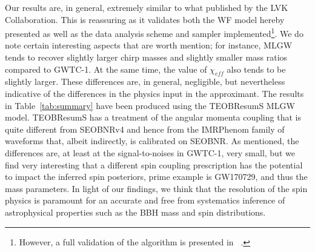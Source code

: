 Our results are, in general, extremely similar to what published by the LVK Collaboration. This is reassuring as it validates both the WF model hereby presented as well as the data analysis scheme and sampler implemented\footnote{However, a full validation of the algorithm is presented in ~\cite{}.}.
We do note certain interesting aspects that are worth mention; for instance, MLGW tends to recover slightly larger chirp masses and slightly 
smaller mass ratios compared to GWTC-1. At the same  time, the value of $\chi_{eff}$ also tends to be slightly larger. These differences are, in general, negligible, but nevertheless indicative of the differences in the physics input in the approximant. The results in Table~\ref{tab:summary} have been produced using the TEOBResumS MLGW model. TEOBResumS has a treatment of the angular momenta coupling that is quite different from SEOBNRv4 and hence from the IMRPhenom family of waveforms that, albeit indirectly, is calibrated on SEOBNR. As mentioned, the differences are, at least at the signal-to-noises in GWTC-1, very small, but we find very interesting that a different spin coupling prescription has the potential to impact the inferred spin posteriors, prime example is GW170729, and thus the mass parameters. 
In light of our findings, we think that the resolution of the spin physics is paramount for an accurate and free from systematics inference of astrophysical properties such as the BBH mass and spin distributions.

